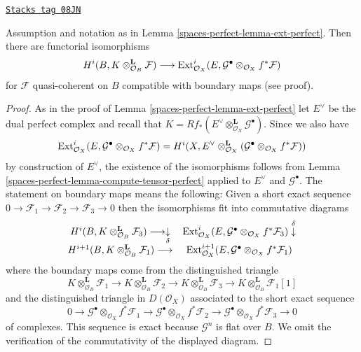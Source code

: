 \begin{lemma}
\label{spaces-perfect-lemma-compute-ext-perfect}
\href{https://stacks.math.columbia.edu/tag/08JN}{\texttt{Stacks tag 08JN}}

Assumption and notation as in Lemma \ref{spaces-perfect-lemma-ext-perfect}.
Then there are functorial isomorphisms
$$
H^i(B, K \otimes^\mathbf{L}_{\mathcal{O}_B} \mathcal{F})
\longrightarrow
\operatorname{Ext}^i_{\mathcal{O}_X}(E,
\mathcal{G}^\bullet \otimes_{\mathcal{O}_X} f^*\mathcal{F})
$$
for $\mathcal{F}$ quasi-coherent on $B$
compatible with boundary maps (see proof).
\end{lemma}

\begin{proof}
As in the proof of Lemma \ref{spaces-perfect-lemma-ext-perfect} let
$E^\vee$ be the dual perfect complex and recall that
$K = Rf_*(E^\vee \otimes_{\mathcal{O}_X}^\mathbf{L} \mathcal{G}^\bullet)$.
Since we also have
$$
\operatorname{Ext}^i_{\mathcal{O}_X}(E,
\mathcal{G}^\bullet \otimes_{\mathcal{O}_X} f^*\mathcal{F})
=
H^i(X, E^\vee \otimes^\mathbf{L}_{\mathcal{O}_X}
(\mathcal{G}^\bullet \otimes_{\mathcal{O}_X} f^*\mathcal{F}))
$$
by construction of $E^\vee$, the existence of the isomorphisms
follows from Lemma \ref{spaces-perfect-lemma-compute-tensor-perfect} applied to $E^\vee$
and $\mathcal{G}^\bullet$.
The statement on boundary maps means the following: Given a short
exact sequence $0 \to \mathcal{F}_1 \to \mathcal{F}_2 \to \mathcal{F}_3 \to 0$
then the isomorphisms fit into commutative diagrams
$$
\begin{array}{cc}H^i(B, K \otimes^\mathbf{L}_{\mathcal{O}_B} \mathcal{F}_3)
\longrightarrow\underset{\delta}{\downarrow} & \operatorname{Ext}^i_{\mathcal{O}_X}(E,
\mathcal{G}^\bullet \otimes_{\mathcal{O}_X} f^*\mathcal{F}_3) \overset{\delta}{\downarrow} \\ H^{i + 1}(B, K \otimes^\mathbf{L}_{\mathcal{O}_B} \mathcal{F}_1)
\longrightarrow & \operatorname{Ext}^{i + 1}_{\mathcal{O}_X}(E,
\mathcal{G}^\bullet \otimes_{\mathcal{O}_X} f^*\mathcal{F}_1)\end{array}
$$
where the boundary maps come from the distinguished triangle
$$
K \otimes^\mathbf{L}_{\mathcal{O}_B} \mathcal{F}_1 \to
K \otimes^\mathbf{L}_{\mathcal{O}_B} \mathcal{F}_2 \to
K \otimes^\mathbf{L}_{\mathcal{O}_B} \mathcal{F}_3 \to
K \otimes^\mathbf{L}_{\mathcal{O}_B} \mathcal{F}_1[1]
$$
and the distinguished triangle in $D(\mathcal{O}_X)$ associated to
the short exact sequence
$$
0 \to
\mathcal{G}^\bullet \otimes_{\mathcal{O}_X} f^*\mathcal{F}_1 \to
\mathcal{G}^\bullet \otimes_{\mathcal{O}_X} f^*\mathcal{F}_2 \to
\mathcal{G}^\bullet \otimes_{\mathcal{O}_X} f^*\mathcal{F}_3 \to 0
$$
of complexes.
This sequence is exact because $\mathcal{G}^n$ is flat over $B$.
We omit the verification of the commutativity of the displayed diagram.
\end{proof}

